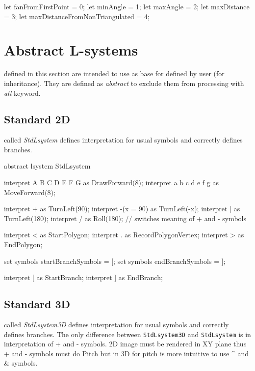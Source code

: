 \begin{LsystemBreak}
let fanFromFirstPoint = 0;
let minAngle = 1;
let maxAngle = 2;
let maxDistance = 3;
let maxDistanceFromNonTriangulated = 4;
\end{LsystemBreak}


\section{Abstract L-systems}

\lsystems defined in this section are intended to use as base \lsystems for \lsystems defined by user (for inheritance).
They are defined as \emph{abstract} to exclude them from processing with \emph{all} keyword.


\subsection{Standard \lsystem 2D}

\lsystem called \emph{StdLsystem} defines interpretation for usual symbols and correctly defines branches.

\begin{LsystemBreak}
abstract lsystem StdLsystem {
	interpret A B C D E F G as DrawForward(8);
	interpret a b c d e f g as MoveForward(8);

	interpret + as TurnLeft(90);
	interpret -(x = 90) as TurnLeft(-x);
	interpret | as TurnLeft(180);
	interpret / as Roll(180); // switches meaning of + and - symbols

	interpret < as StartPolygon;
	interpret . as RecordPolygonVertex;
	interpret > as EndPolygon;

	set symbols startBranchSymbols = [;
	set symbols endBranchSymbols = ];

	interpret [ as StartBranch;
	interpret ] as EndBranch;
}
\end{LsystemBreak}


\subsection{Standard \lsystem 3D}

\lsystem called \emph{StdLsystem3D} defines interpretation for usual symbols and correctly defines branches.
The only difference between \texttt{StdLsystem3D} and \texttt{StdLsystem} is in interpretation of + and - symbols.
2D image must be rendered in XY plane thus + and - symbols must do Pitch but in 3D for pitch is more intuitive to use \^{} and \& symbols.

